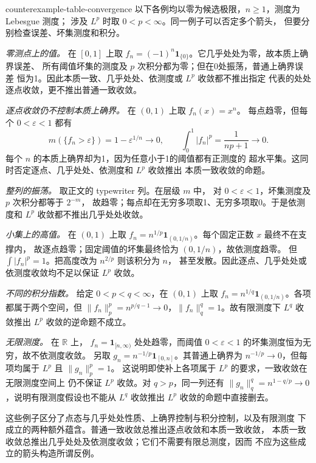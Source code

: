 \begin{solution}{counterexample-table-convergence}
以下各例均以零为候选极限，\(n\ge1\)，测度为 Lebesgue 测度；
涉及 \(L^p\) 时取 \(0<p<\infty\)。同一例子可以否定多个箭头，
但要分别检查误差、坏集测度和积分。

\emph{零测点上的值。} 在 \([0,1]\) 上取
\(f_n=(-1)^n\mathbf1_{\{0\}}\)。它几乎处处为零，故本质上确界误差、
所有阈值坏集的测度及 \(p\) 次积分都为零；但在0处振荡，普通上确界误差
恒为1。因此本质一致、几乎处处、依测度或 \(L^p\) 收敛都不推出指定
代表的处处逐点收敛，更不推出普通一致收敛。

\emph{逐点收敛仍不控制本质上确界。} 在 \((0,1)\) 上取 \(f_n(x)=x^n\)。
每点趋零，但每个 \(0<\varepsilon<1\) 都有
\[
 m(\{f_n>\varepsilon\})=1-\varepsilon^{1/n}\to0,
 \qquad \int_0^1|f_n|^p=\frac1{np+1}\to0.
\]
每个 \(n\) 的本质上确界却为1，因为任意小于1的阈值都有正测度的
超水平集。这同时否定逐点、几乎处处、依测度和 \(L^p\) 收敛推出
本质一致收敛的命题。

\emph{整列的振荡。} 取正文的 typewriter 列。在层级 \(m\) 中，
对 \(0<\varepsilon<1\)，坏集测度及 \(p\) 次积分都等于 \(2^{-m}\)，
故趋零；每点却在无穷多项取1、无穷多项取0。于是依测度和 \(L^p\)
收敛都不推出几乎处处收敛。

\emph{小集上的高值。} 在 \((0,1)\) 上取
\(f_n=n^{1/p}\mathbf1_{(0,1/n)}\)。每个固定正数 \(x\) 最终不在支撑内，
故逐点趋零；固定阈值的坏集最终恰为 \((0,1/n)\)，故依测度趋零。
但 \(\int|f_n|^p=1\)。把高度改为 \(n^{2/p}\) 则该积分为 \(n\)，
甚至发散。因此逐点、几乎处处或依测度收敛均不足以保证 \(L^p\) 收敛。

\emph{不同的积分指数。} 给定 \(0<p<q<\infty\)，在 \((0,1)\) 上取
\(f_n=n^{1/q}\mathbf1_{(0,1/n)}\)。各项都属于两个空间，但
\(\|f_n\|_p^p=n^{p/q-1}\to0\)，\(\|f_n\|_q^q=1\)。故有限测度下
\(L^q\) 收敛推出 \(L^p\) 收敛的逆命题不成立。

\emph{无限测度。} 在 \(\mathbb R\) 上，
\(f_n=\mathbf1_{[n,\infty)}\) 处处趋零，而阈值
\(0<\varepsilon<1\) 的坏集测度恒为无穷，故不依测度收敛。
另取 \(g_n=n^{-1/p}\mathbf1_{[0,n]}\)。其普通上确界为
\(n^{-1/p}\to0\)，但每项均属于 \(L^p\) 且 \(\|g_n\|_p^p=1\)。
这说明即使补上各项属于 \(L^p\) 的要求，一致收敛在无限测度空间上
仍不保证 \(L^p\) 收敛。对 \(q>p\)，同一列还有
\(\|g_n\|_q^q=n^{1-q/p}\to0\)，说明有限测度假设也不能从
\(L^q\) 收敛推出 \(L^p\) 收敛的命题中直接删去。

这些例子区分了点态与几乎处处性质、上确界控制与积分控制，以及有限测度
下成立的两种额外蕴含。普通一致收敛总推出逐点收敛和本质一致收敛，
本质一致收敛总推出几乎处处及依测度收敛；它们不需要有限总测度，因而
不应为这些成立的箭头构造所谓反例。
\end{solution}
